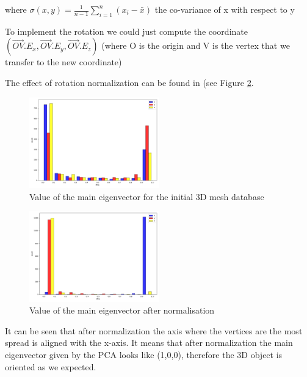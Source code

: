 \documentclass[10pt,twocolumn,letterpaper]{article}
\begin{document}
where $ \sigma(x,y) = \frac{1}{n-1} \sum\limits_{i=1}^n ( x_i - \bar{x} ) $ the co-variance of x with respect to y
	
	To implement the rotation we could just compute the coordinate $(\overrightarrow{OV}.E_x, \overrightarrow{OV}.E_y, \overrightarrow{OV}.E_z)$ (where O is the origin and V is the vertex that we transfer to the new coordinate)
	
	The effect of rotation normalization can be found in  (see Figure \ref{fig:PCA-after}.

\begin{figure}[h!]
\begin{center}
  \includegraphics[width=0.5\textwidth]{picture/Initial pca}
  \caption{Value of the main eigenvector for the initial 3D mesh database}
  \label{fig:PCA-before}
  \end{center}
\end{figure}

\begin{figure}[h!]
\begin{center}
  \includegraphics[width=0.5\textwidth]{picture/Normalised pca}
  \caption{Value of the main eigenvector after normalisation}
  \label{fig:PCA-after}
  \end{center}
\end{figure}
	
	It can be seen that after normalization the axis where the vertices are the most spread is aligned with the x-axis. It means that after normalization the main eigenvector given by the PCA looks like (1,0,0), therefore the 3D object is oriented as we expected.
	
\end{document}
